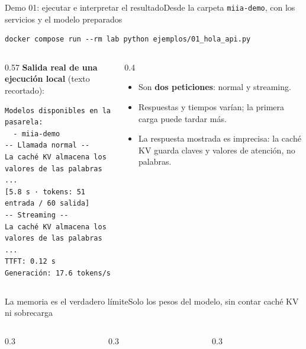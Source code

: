 \begin{frame}[fragile]{Demo 01: ejecutar e interpretar el resultado}{Desde la carpeta \texttt{miia-demo}, con los servicios y el modelo preparados}
	\begin{lstlisting}[language={}]
docker compose run --rm lab python ejemplos/01_hola_api.py
\end{lstlisting}
	\begin{columns}[T]
		\begin{column}{0.57\textwidth}
			{\scriptsize\textbf{Salida real de una ejecución local} (texto recortado):}
			\begin{lstlisting}[language={}]
Modelos disponibles en la pasarela:
  - miia-demo
-- Llamada normal --
La caché KV almacena los valores de las palabras ...
[5.8 s · tokens: 51 entrada / 60 salida]
-- Streaming --
La caché KV almacena los valores de las palabras ...
TTFT: 0.12 s
Generación: 17.6 tokens/s
\end{lstlisting}
		\end{column}
		\begin{column}{0.4\textwidth}
			\footnotesize
			\begin{itemize}
				\item Son \textbf{dos peticiones}: normal y streaming.
				\item Respuestas y tiempos varían; la primera carga puede tardar más.
				\item La respuesta mostrada es imprecisa: la caché KV guarda claves y valores de atención, no palabras.
			\end{itemize}
		\end{column}
	\end{columns}
\end{frame}

\begin{frame}{La memoria es el verdadero límite}{Solo los pesos del modelo, sin contar caché KV ni sobrecarga}
	\vspace{0.3cm}
	\begin{columns}[T]
		\begin{column}{0.3\textwidth}
		\end{column}
		\begin{column}{0.3\textwidth}
		\end{column}
		\begin{column}{0.3\textwidth}
		\end{column}
	\end{columns}
\end{frame}

